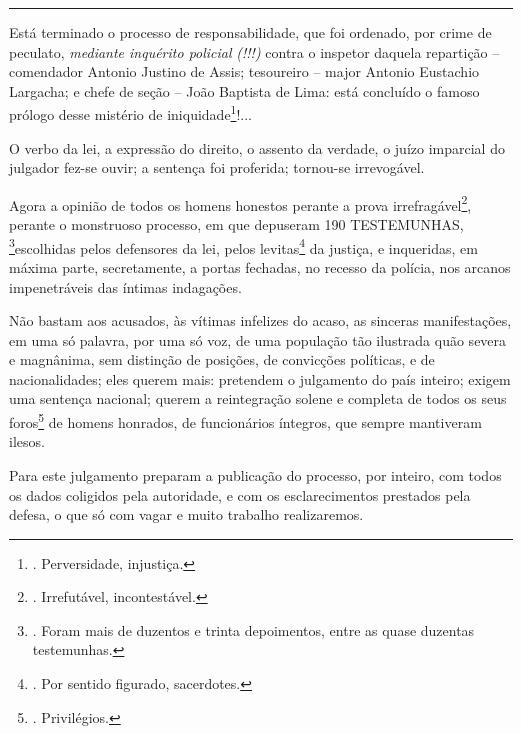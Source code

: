 \begin{center}\rule{0.5\linewidth}{\linethickness}\end{center}

Está terminado o processo de responsabilidade, que foi ordenado, por
crime de peculato, \emph{mediante inquérito policial} \emph{(!!!)}
contra o inspetor daquela repartição -- comendador Antonio Justino de
Assis; tesoureiro -- major Antonio Eustachio Largacha; e chefe de seção
-- João Baptista de Lima: está concluído o famoso prólogo desse mistério
de iniquidade\footnote{. Perversidade, injustiça.}!...

O verbo da lei, a expressão do direito, o assento da verdade, o juízo
imparcial do julgador fez-se ouvir; a sentença foi proferida; tornou-se
irrevogável.

Agora a opinião de todos os homens honestos perante a prova
irrefragável\footnote{. Irrefutável, incontestável.}, perante o
monstruoso processo, em que depuseram 190 TESTEMUNHAS, \footnote{. Foram
  mais de duzentos e trinta depoimentos, entre as quase duzentas
  testemunhas.}escolhidas pelos defensores da lei, pelos
levitas\footnote{. Por sentido figurado, sacerdotes.} da justiça, e
inqueridas, em máxima parte, secretamente, a portas fechadas, no recesso
da polícia, nos arcanos impenetráveis das íntimas indagações.

Não bastam aos acusados, às vítimas infelizes do acaso, as sinceras
manifestações, em uma só palavra, por uma só voz, de uma população tão
ilustrada quão severa e magnânima, sem distinção de posições, de
convicções políticas, e de nacionalidades; eles querem mais: pretendem o
julgamento do país inteiro; exigem uma sentença nacional; querem a
reintegração solene e completa de todos os seus foros\footnote{.
  Privilégios.} de homens honrados, de funcionários íntegros, que sempre
mantiveram ilesos.

Para este julgamento preparam a publicação do processo, por inteiro, com
todos os dados coligidos pela autoridade, e com os esclarecimentos
prestados pela defesa, o que só com vagar e muito trabalho realizaremos.

